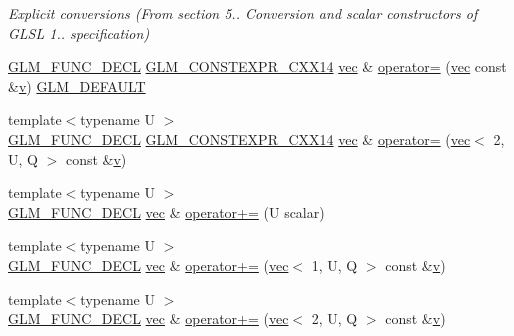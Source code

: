 \begin{DoxyCompactItemize}
\begin{DoxyCompactList}\small\item\em Explicit conversions (From section 5.. Conversion and scalar constructors of G\+L\+SL 1.. specification) \end{DoxyCompactList}\item 
\mbox{\hyperlink{setup_8hpp_ab2d052de21a70539923e9bcbf6e83a51}{G\+L\+M\+\_\+\+F\+U\+N\+C\+\_\+\+D\+E\+CL}} \mbox{\hyperlink{setup_8hpp_a4dd12abf5e1164bc57f3a34671d03844}{G\+L\+M\+\_\+\+C\+O\+N\+S\+T\+E\+X\+P\+R\+\_\+\+C\+X\+X14}} \mbox{\hyperlink{structglm_1_1vec}{vec}} \& \mbox{\hyperlink{structglm_1_1vec_3_012_00_01_t_00_01_q_01_4_a1cdeb98b13f93223e04b171b4f5b7d0c}{operator=}} (\mbox{\hyperlink{structglm_1_1vec}{vec}} const \&\mbox{\hyperlink{_s_d_l__opengl_8h_a10a82eabcb59d2fcd74acee063775f90}{v}}) \mbox{\hyperlink{setup_8hpp_aefce7051c376a64ba89fa93a9f63bc2c}{G\+L\+M\+\_\+\+D\+E\+F\+A\+U\+LT}}
\item 
{\footnotesize template$<$typename U $>$ }\\\mbox{\hyperlink{setup_8hpp_ab2d052de21a70539923e9bcbf6e83a51}{G\+L\+M\+\_\+\+F\+U\+N\+C\+\_\+\+D\+E\+CL}} \mbox{\hyperlink{setup_8hpp_a4dd12abf5e1164bc57f3a34671d03844}{G\+L\+M\+\_\+\+C\+O\+N\+S\+T\+E\+X\+P\+R\+\_\+\+C\+X\+X14}} \mbox{\hyperlink{structglm_1_1vec}{vec}} \& \mbox{\hyperlink{structglm_1_1vec_3_012_00_01_t_00_01_q_01_4_a816f1cde5e8bbb6425dd5a93b8579763}{operator=}} (\mbox{\hyperlink{structglm_1_1vec}{vec}}$<$ 2, U, Q $>$ const \&\mbox{\hyperlink{_s_d_l__opengl_8h_a10a82eabcb59d2fcd74acee063775f90}{v}})
\item 
{\footnotesize template$<$typename U $>$ }\\\mbox{\hyperlink{setup_8hpp_ab2d052de21a70539923e9bcbf6e83a51}{G\+L\+M\+\_\+\+F\+U\+N\+C\+\_\+\+D\+E\+CL}} \mbox{\hyperlink{structglm_1_1vec}{vec}} \& \mbox{\hyperlink{structglm_1_1vec_3_012_00_01_t_00_01_q_01_4_a7c1fa9f2692a42abc2cef20f639f7adf}{operator+=}} (U scalar)
\item 
{\footnotesize template$<$typename U $>$ }\\\mbox{\hyperlink{setup_8hpp_ab2d052de21a70539923e9bcbf6e83a51}{G\+L\+M\+\_\+\+F\+U\+N\+C\+\_\+\+D\+E\+CL}} \mbox{\hyperlink{structglm_1_1vec}{vec}} \& \mbox{\hyperlink{structglm_1_1vec_3_012_00_01_t_00_01_q_01_4_a1c157e104fcc32dba87fcd6a47457523}{operator+=}} (\mbox{\hyperlink{structglm_1_1vec}{vec}}$<$ 1, U, Q $>$ const \&\mbox{\hyperlink{_s_d_l__opengl_8h_a10a82eabcb59d2fcd74acee063775f90}{v}})
\item 
{\footnotesize template$<$typename U $>$ }\\\mbox{\hyperlink{setup_8hpp_ab2d052de21a70539923e9bcbf6e83a51}{G\+L\+M\+\_\+\+F\+U\+N\+C\+\_\+\+D\+E\+CL}} \mbox{\hyperlink{structglm_1_1vec}{vec}} \& \mbox{\hyperlink{structglm_1_1vec_3_012_00_01_t_00_01_q_01_4_aca945ef129a7730690a1b216b5aa67b0}{operator+=}} (\mbox{\hyperlink{structglm_1_1vec}{vec}}$<$ 2, U, Q $>$ const \&\mbox{\hyperlink{_s_d_l__opengl_8h_a10a82eabcb59d2fcd74acee063775f90}{v}})

\end{DoxyCompactItemize}
